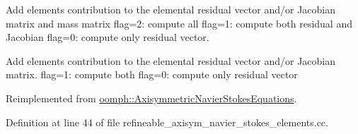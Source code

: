 Add element\textquotesingle{}s contribution to the elemental residual vector and/or Jacobian matrix and mass matrix flag=2\+: compute all flag=1\+: compute both residual and Jacobian flag=0\+: compute only residual vector. 

Add element\textquotesingle{}s contribution to the elemental residual vector and/or Jacobian matrix. flag=1\+: compute both flag=0\+: compute only residual vector 

Reimplemented from \hyperlink{classoomph_1_1AxisymmetricNavierStokesEquations_a9a19729ca5b08abca8e8202614e70b29}{oomph\+::\+Axisymmetric\+Navier\+Stokes\+Equations}.



Definition at line 44 of file refineable\+\_\+axisym\+\_\+navier\+\_\+stokes\+\_\+elements.\+cc.



